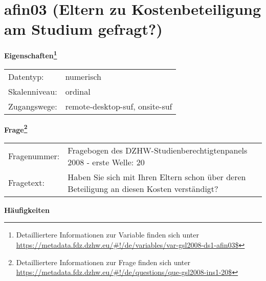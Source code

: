 
    \setcounter{footnote}{0}

    \vspace*{-1.8cm}
	\section{afin03 (Eltern zu Kostenbeteiligung am Studium gefragt?)}
	\label{section:afin03}



    \vspace*{0.5cm}
    \noindent\textbf{Eigenschaften\footnote{Detailliertere Informationen zur Variable finden sich unter
		\url{https://metadata.fdz.dzhw.eu/\#!/de/variables/var-gsl2008-ds1-afin03$}}}\\
	\begin{tabularx}{\hsize}{@{}lX}
	Datentyp: & numerisch \\
	Skalenniveau: & ordinal \\
	Zugangswege: &
	  remote-desktop-suf, 
	  onsite-suf
 \\
    \end{tabularx}



				\vspace*{0.5cm}
                \noindent\textbf{Frage\footnote{Detailliertere Informationen zur Frage finden sich unter
		              \url{https://metadata.fdz.dzhw.eu/\#!/de/questions/que-gsl2008-ins1-20$}}}\\
				\begin{tabularx}{\hsize}{@{}lX}
					Fragenummer: &
					  Fragebogen des DZHW-Studienberechtigtenpanels 2008 - erste Welle:
					  20
 \\
					Fragetext: & Haben Sie sich mit Ihren Eltern schon über deren Beteiligung an diesen Kosten verständigt? \\
				\end{tabularx}





        		\vspace*{0.5cm}
                \noindent\textbf{Häufigkeiten}

